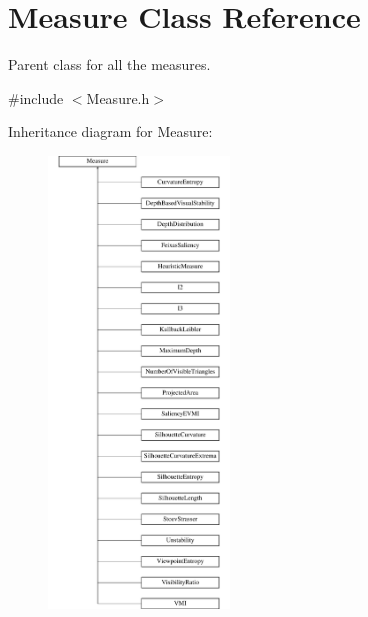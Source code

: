 \hypertarget{class_measure}{\section{Measure Class Reference}
\label{class_measure}
}


Parent class for all the measures.  




{\ttfamily \#include $<$Measure.\+h$>$}

Inheritance diagram for Measure\+:\begin{figure}[H]
\begin{center}
\leavevmode
\includegraphics[height=12.000000cm]{class_measure}
\end{center}
\end{figure}
